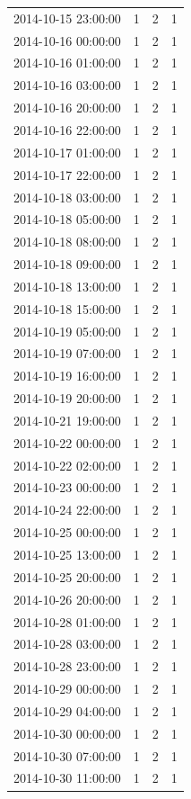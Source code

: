 \begin{tabular}{lrrr}
2014-10-15 23:00:00 & 1 & 2 & 1 \\
2014-10-16 00:00:00 & 1 & 2 & 1 \\
2014-10-16 01:00:00 & 1 & 2 & 1 \\
2014-10-16 03:00:00 & 1 & 2 & 1 \\
2014-10-16 20:00:00 & 1 & 2 & 1 \\
2014-10-16 22:00:00 & 1 & 2 & 1 \\
2014-10-17 01:00:00 & 1 & 2 & 1 \\
2014-10-17 22:00:00 & 1 & 2 & 1 \\
2014-10-18 03:00:00 & 1 & 2 & 1 \\
2014-10-18 05:00:00 & 1 & 2 & 1 \\
2014-10-18 08:00:00 & 1 & 2 & 1 \\
2014-10-18 09:00:00 & 1 & 2 & 1 \\
2014-10-18 13:00:00 & 1 & 2 & 1 \\
2014-10-18 15:00:00 & 1 & 2 & 1 \\
2014-10-19 05:00:00 & 1 & 2 & 1 \\
2014-10-19 07:00:00 & 1 & 2 & 1 \\
2014-10-19 16:00:00 & 1 & 2 & 1 \\
2014-10-19 20:00:00 & 1 & 2 & 1 \\
2014-10-21 19:00:00 & 1 & 2 & 1 \\
2014-10-22 00:00:00 & 1 & 2 & 1 \\
2014-10-22 02:00:00 & 1 & 2 & 1 \\
2014-10-23 00:00:00 & 1 & 2 & 1 \\
2014-10-24 22:00:00 & 1 & 2 & 1 \\
2014-10-25 00:00:00 & 1 & 2 & 1 \\
2014-10-25 13:00:00 & 1 & 2 & 1 \\
2014-10-25 20:00:00 & 1 & 2 & 1 \\
2014-10-26 20:00:00 & 1 & 2 & 1 \\
2014-10-28 01:00:00 & 1 & 2 & 1 \\
2014-10-28 03:00:00 & 1 & 2 & 1 \\
2014-10-28 23:00:00 & 1 & 2 & 1 \\
2014-10-29 00:00:00 & 1 & 2 & 1 \\
2014-10-29 04:00:00 & 1 & 2 & 1 \\
2014-10-30 00:00:00 & 1 & 2 & 1 \\
2014-10-30 07:00:00 & 1 & 2 & 1 \\
2014-10-30 11:00:00 & 1 & 2 & 1 \\

\end{tabular}
